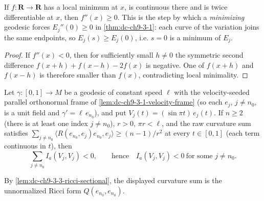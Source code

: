 \begin{lemma}
  \label{lem:dc-ch9-3-1-second-order-min}
  \leanok
  If $f:\mathbf{R}\to\mathbf{R}$ has a local minimum at $x$, is continuous there and is twice
  differentiable at $x$, then $f''(x)\ge 0$. This is the step by which a \emph{minimizing}
  geodesic forces $E_j''(0)\ge 0$ in \cref{thm:dc-ch9-3-1}: each curve of the variation joins
  the same endpoints, so $E_j(s)\ge E_j(0)$, i.e. $s=0$ is a minimum of $E_j$.
\end{lemma}
\begin{proof}
  \leanok
  \sketch
  If $f''(x)<0$, then for sufficiently small $h\ne0$ the symmetric second
  difference $f(x+h)+f(x-h)-2f(x)$ is negative. One of $f(x+h)$ and
  $f(x-h)$ is therefore smaller than $f(x)$, contradicting local minimality.
\end{proof}
\begin{lemma}
  \label{lem:dc-ch9-3-1-index-sum-neg}
  \leanok
  Let $\gamma:[0,1]\to M$ be a geodesic of constant speed $\ell$ with the velocity-seeded
  parallel orthonormal frame of \cref{lem:dc-ch9-3-1-velocity-frame} (so each $e_j$, $j\ne n_0$,
  is a unit field and $\gamma'=\ell\,e_{n_0}$), and put $V_j(t)=(\sin\pi t)\,e_j(t)$. If $n\ge 2$
  (there is at least one index $j\ne n_0$), $r>0$, $\pi r<\ell$, and the raw curvature sum satisfies
  $\sum_{j\ne n_0}\langle R(e_{n_0},e_j)e_{n_0},e_j\rangle\ge (n-1)/r^2$ at every $t\in[0,1]$
  (each term continuous in $t$), then
  $$
  \sum_{j\ne n_0} I_a(V_j,V_j)<0,\qquad\text{hence}\quad I_a(V_j,V_j)<0\ \text{for some }j\ne n_0.
  $$

  By \cref{lem:dc-ch9-3-3-ricci-sectional}, the displayed curvature sum is
  the unnormalized Ricci form $Q(e_{n_0},e_{n_0})$.
\end{lemma}
